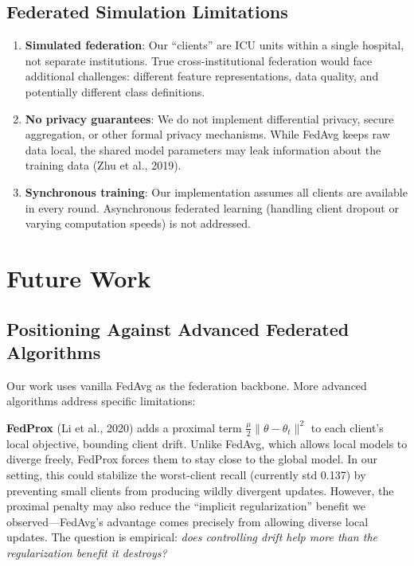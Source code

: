 \documentclass[11pt,a4paper]{report}
\begin{document}
\section{Federated Simulation Limitations}

\begin{enumerate}[leftmargin=2em]
\item \textbf{Simulated federation}: Our ``clients'' are ICU units within a single hospital, not separate institutions. True cross-institutional federation would face additional challenges: different feature representations, data quality, and potentially different class definitions.
\item \textbf{No privacy guarantees}: We do not implement differential privacy, secure aggregation, or other formal privacy mechanisms. While FedAvg keeps raw data local, the shared model parameters may leak information about the training data (Zhu et al., 2019).
\item \textbf{Synchronous training}: Our implementation assumes all clients are available in every round. Asynchronous federated learning (handling client dropout or varying computation speeds) is not addressed.
\end{enumerate}


\chapter{Future Work}

\section{Positioning Against Advanced Federated Algorithms}

Our work uses vanilla FedAvg as the federation backbone. More advanced algorithms address specific limitations:

\textbf{FedProx} (Li et al., 2020) adds a proximal term $\frac{\mu}{2}\|\theta - \theta_t\|^2$ to each client's local objective, bounding client drift. Unlike FedAvg, which allows local models to diverge freely, FedProx forces them to stay close to the global model. In our setting, this could stabilize the worst-client recall (currently std 0.137) by preventing small clients from producing wildly divergent updates. However, the proximal penalty may also reduce the ``implicit regularization'' benefit we observed---FedAvg's advantage comes precisely from allowing diverse local updates. The question is empirical: \emph{does controlling drift help more than the regularization benefit it destroys?}
\end{document}
